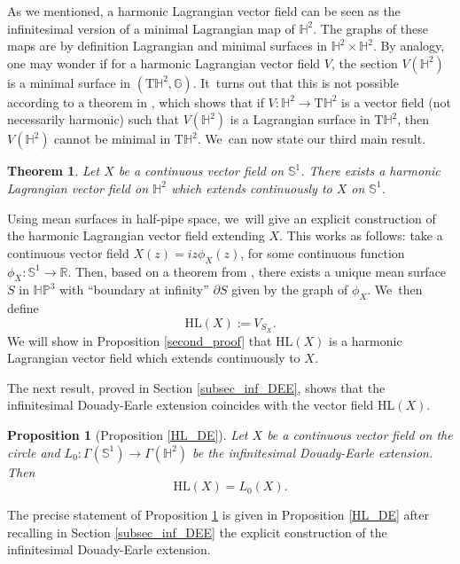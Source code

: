 \documentclass[10pt]{amsart}
\theoremstyle{plain}
\newtheorem{theorem}[cor]{Theorem}
\newtheorem{prop}[cor]{Proposition}
\theoremstyle{definition}
\newcommand{\HP}{\mathbb{HP}^3}
\begin{document}
As we mentioned, a harmonic Lagrangian vector field can be seen as the infinitesimal version of a minimal Lagrangian map of \(\mathbb{H}^2\). The graphs of these maps are by definition Lagrangian and minimal surfaces in \(\mathbb{H}^2 \times \mathbb{H}^2\). By analogy, one may wonder if for a harmonic Lagrangian vector field \(V\), the section \(V(\mathbb{H}^2)\) is a minimal surface in \((\mathrm{T}\mathbb{H}^2, \mathbb{G})\). It~turns out that this is not possible according to a theorem in \cite[Prop.\,2.2]{ML_in_tangent_bundle}, which shows that if \(V: \mathbb{H}^2 \to \mathrm{T}\mathbb{H}^2\) is a vector field (not necessarily harmonic) such that \(V(\mathbb{H}^2)\) is a Lagrangian surface in \(\mathrm{T}\mathbb{H}^2\), then \(V(\mathbb{H}^2)\) cannot be minimal in \(\mathrm{T}\mathbb{H}^2\). We~can now state our third main result.
\begin{theorem}\label{intro_ex_HL}
Let \(X\) be a continuous vector field on \(\mathbb{S}^1\). There exists a harmonic Lagrangian vector field on \(\mathbb{H}^2\) which extends continuously to \(X\) on \(\mathbb{S}^1\).
\end{theorem}
Using mean surfaces in half-pipe space, we~will give an explicit construction of the harmonic Lagrangian vector field extending \(X\). This works as follows: take a continuous vector field \(X(z) = iz\phi_X(z)\), for some continuous function \(\phi_X: \mathbb{S}^1 \to \mathbb{R}\). Then, based on a theorem from \cite{barbotfillastre}, there exists a unique mean surface \(S\) in \(\HP\) with ``boundary at infinity'' \(\partial S\) given by the graph of \(\phi_X\). We~then define
\begin{equation}\label{intro_HL}
\mathrm{HL}(X) := V_{S_X}.
\end{equation}
We will show in Proposition \ref{second_proof} that \(\mathrm{HL}(X)\) is a harmonic Lagrangian vector field which extends continuously to \(X\).

The next result, proved in Section \ref{subsec_inf_DEE}, shows that the infinitesimal Douady-Earle extension coincides with the vector field \(\mathrm{HL}(X)\).

\begin{prop}[Proposition \ref{HL_DE}]\label{intro_pro_DE}
Let \(X\) be a continuous vector field on the circle and \(L_0: \Gamma(\mathbb{S}^1) \to \Gamma(\mathbb{H}^2)\) be the infinitesimal Douady-Earle extension. Then
\[
\mathrm{HL}(X) = L_0(X).
\]
\end{prop}
The precise statement of Proposition \ref{intro_pro_DE} is given in Proposition \ref{HL_DE} after recalling in Section \ref{subsec_inf_DEE} the explicit construction of the infinitesimal Douady-Earle extension.
\end{document}
